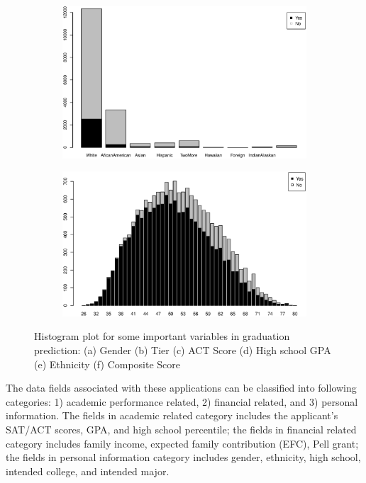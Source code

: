 \documentclass[12pt,english]{report}
\begin{document}
\begin{figure}[p]
\medskip
\begin{subfigure}{0.48\textwidth}
\includegraphics[width=\linewidth]{pic/grad_ethnicity}
\caption{} \label{grad:e}
\end{subfigure}\hspace*{\fill}
\begin{subfigure}{0.48\textwidth}
\includegraphics[width=\linewidth]{pic/grad_comp}
\caption{} \label{grad:f}
\end{subfigure}
  \caption{Histogram plot for some important variables in graduation
prediction: 
                        (a) Gender (b) Tier (c) ACT Score (d) High school GPA
(e) Ethnicity (f) Composite Score} 
  \label{grad_sum} 
\end{figure}



The data fields associated with these applications can be classified into
following categories: 1) academic performance related, 2) financial related,
and 3) personal information. The fields in academic related category includes
the applicant's SAT/ACT scores, GPA, and high school percentile; the  fields in
financial  related category includes family income, expected family
contribution (EFC), Pell grant; the fields in personal information category
includes gender, ethnicity, high school, intended college, and intended major.
\end{document}
